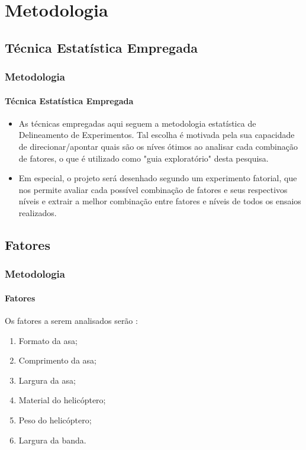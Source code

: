 \documentclass{beamer}
\begin{document}
\section{Metodologia}
   \subsection{Técnica Estatística Empregada}
      \begin{frame}
           \frametitle{Metodologia}
               \framesubtitle{Técnica Estatística Empregada}
                 \begin{itemize}
                     \item As técnicas empregadas aqui seguem a metodologia estatística de Delineamento de Experimentos. Tal escolha é motivada pela sua capacidade de direcionar/apontar quais são os níves ótimos ao analisar cada combinação de fatores, o que é utilizado como "guia exploratório" desta pesquisa.

                     \item Em especial, o projeto será desenhado segundo um experimento fatorial, que nos permite avaliar cada possível combinação de fatores e seus respectivos níveis e extrair a melhor combinação entre fatores e níveis de todos os ensaios realizados.

                 \end{itemize}
      \end{frame}

    \subsection{Fatores}
        \begin{frame}
            \frametitle{Metodologia}
                \framesubtitle{Fatores}
                    Os fatores a serem analisados serão :

                        \begin{enumerate}
                            \item Formato da asa;
                            \item Comprimento da asa;
                            \item Largura da asa;
                            \item Material do helicóptero;
                            \item Peso do helicóptero;
                            \item Largura da banda.
                        \end{enumerate}

        \end{frame}
\end{document}
